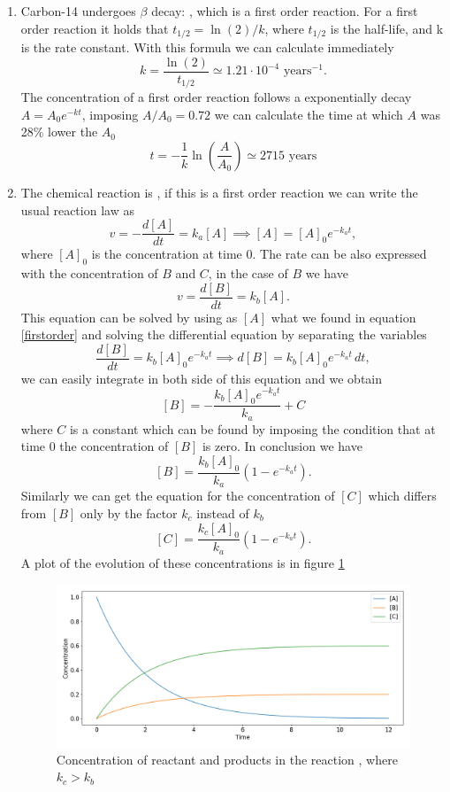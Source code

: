 \documentclass[a4paper,10pt]{article}
\begin{document}
\begin{enumerate}[label=\alph*)]
	\item Carbon-14 undergoes $\beta$ decay: , which is a first order reaction. For a first order reaction it holds that $t_{1/2} = \ln(2)/k$, where $t_{1/2}$ is the half-life, and k is the rate constant. With this formula we can calculate immediately 
	\[k= \frac{\ln(2)}{t_{1/2}} \simeq 1.21\cdot10^{-4} \,\,\text{years}^{-1}.\]
	The concentration of a first order reaction follows a exponentially decay $A = A_0 e^{-kt}$, imposing $A/A_0 = 0.72$ we can calculate the time at which $A$ was 28\% lower the $A_0$
	\[t = -\frac{1}{k}\ln\left(\frac{A}{A_0}\right) \simeq 2715  \,\,\text{years}\]
	\item The chemical reaction is , if this is a first order reaction we can write the usual reaction law as
	\begin{equation}\label{firstorder} v = -\frac{d[A]}{dt} = k_a [A] \implies [A] = [A]_0 e^{-k_a t},\end{equation}
	where $[A]_0$ is the concentration at time 0. The rate can be also expressed with the concentration of $B$ and $C$, in the case of $B$ we have
	\[v = \frac{d[B]}{dt} = k_b [A].\]
	This equation can be solved by using as $[A]$ what we found in equation \eqref{firstorder} and solving the differential equation by separating the variables
	\[\frac{d[B]}{dt} = k_b [A]_0 e^{-k_a t} \implies d[B] = k_b [A]_0 e^{-k_a t}\,dt,\]
	we can easily integrate in both side of this equation and we obtain
	\[[B] = -\frac{k_b [A]_0 e^{-k_a t}}{k_a} + C\]
	where $C$ is a constant which can be found by imposing the condition that at time 0 the concentration of $[B]$ is zero. In conclusion we have
	\[[B] = \frac{k_b [A]_0}{k_a}(1-e^{-k_a t}). \]
	Similarly we can get the equation for the concentration of $[C]$ which differs from $[B]$ only by the factor $k_c$ instead of $k_b$
	\[[C] = \frac{k_c [A]_0}{k_a}(1-e^{-k_a t}).\]
	A plot of the evolution of these concentrations is in figure \ref{plot}
	\begin{figure}[H]
\centering
\includegraphics[width=\textwidth]{question}
\caption{Concentration of reactant and products in the reaction , where $k_c > k_b$}\label{plot}
\end{figure}
\end{enumerate}
\end{document}
